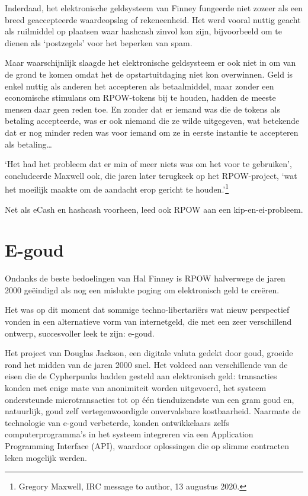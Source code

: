 \documentclass[smalldemyvopaper,11pt,twoside,onecolumn,openright,extrafontsizes,hidelinks]{memoir}
\begin{document}
Inderdaad, het elektronische geldsysteem van Finney fungeerde niet
zozeer als een breed geaccepteerde waardeopslag of rekeneenheid. Het
werd vooral nuttig geacht als ruilmiddel op plaatsen waar hashcash
zinvol kon zijn, bijvoorbeeld om te dienen als `postzegels' voor het
beperken van spam.

Maar waarschijnlijk slaagde het elektronische geldsysteem er ook niet in
om van de grond te komen omdat het de opstartuitdaging niet kon
overwinnen. Geld is enkel nuttig als anderen het accepteren als
betaalmiddel, maar zonder een economische stimulans om RPOW-tokens bij
te houden, hadden de meeste mensen daar geen reden toe. En zonder dat er
iemand was die de tokens als betaling accepteerde, was er ook niemand
die ze wilde uitgegeven, wat betekende dat er nog minder reden was voor
iemand om ze in eerste instantie te accepteren als betaling\ldots{}

`Het had het probleem dat er min of meer niets was om het voor te
gebruiken', concludeerde Maxwell ook, die jaren later terugkeek op het
RPOW-project, `wat het moeilijk maakte om de aandacht erop gericht te
houden.'\footnote{Gregory Maxwell, IRC message to author, 13 augustus
  2020.}

Net als eCash en hashcash voorheen, leed ook RPOW aan een
kip-en-ei-probleem.

\section{E-goud}\label{e-goud}

Ondanks de beste bedoelingen van Hal Finney is RPOW halverwege de jaren
2000 geëindigd als nog een mislukte poging om elektronisch geld te
creëren.

Het was op dit moment dat sommige techno-libertariërs wat nieuw
perspectief vonden in een alternatieve vorm van internetgeld, die met
een zeer verschillend ontwerp, succesvoller leek te zijn: e-goud.

Het project van Douglas Jackson, een digitale valuta gedekt door goud,
groeide rond het midden van de jaren 2000 snel. Het voldeed aan
verschillende van de eisen die de Cypherpunks hadden gesteld aan
elektronisch geld: transacties konden met enige mate van anonimiteit
worden uitgevoerd, het systeem ondersteunde microtransacties tot op één
tienduizendste van een gram goud en, natuurlijk, goud zelf
vertegenwoordigde onvervalsbare kostbaarheid. Naarmate de technologie
van e-goud verbeterde, konden ontwikkelaars zelfs computerprogramma's in
het systeem integreren via een Application Programming Interface (API),
waardoor oplossingen die op slimme contracten leken mogelijk werden.
\end{document}
